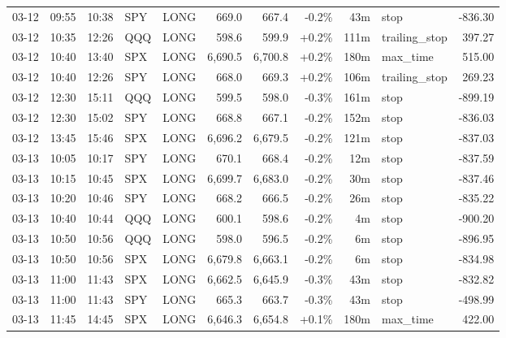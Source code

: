 \documentclass[11pt,a4paper,twoside]{article}
\begin{document}
\begin{center}
\begin{longtable}{>{\color{txtmain}}l l l l l r r r r >{\color{txtmain}}l r}
03-12 & 09:55 & 10:38 & SPY & LONG & 669.0 & 667.4 & \textcolor{lossred}{-0.2\%} & 43m & stop & \textcolor{lossred}{-836.30} \\
03-12 & 10:35 & 12:26 & QQQ & LONG & 598.6 & 599.9 & \textcolor{wingreen}{+0.2\%} & 111m & trailing\_stop & \textcolor{wingreen}{397.27} \\
03-12 & 10:40 & 13:40 & SPX & LONG & 6,690.5 & 6,700.8 & \textcolor{wingreen}{+0.2\%} & 180m & max\_time & \textcolor{wingreen}{515.00} \\
03-12 & 10:40 & 12:26 & SPY & LONG & 668.0 & 669.3 & \textcolor{wingreen}{+0.2\%} & 106m & trailing\_stop & \textcolor{wingreen}{269.23} \\
03-12 & 12:30 & 15:11 & QQQ & LONG & 599.5 & 598.0 & \textcolor{lossred}{-0.3\%} & 161m & stop & \textcolor{lossred}{-899.19} \\
03-12 & 12:30 & 15:02 & SPY & LONG & 668.8 & 667.1 & \textcolor{lossred}{-0.2\%} & 152m & stop & \textcolor{lossred}{-836.03} \\
03-12 & 13:45 & 15:46 & SPX & LONG & 6,696.2 & 6,679.5 & \textcolor{lossred}{-0.2\%} & 121m & stop & \textcolor{lossred}{-837.03} \\
03-13 & 10:05 & 10:17 & SPY & LONG & 670.1 & 668.4 & \textcolor{lossred}{-0.2\%} & 12m & stop & \textcolor{lossred}{-837.59} \\
03-13 & 10:15 & 10:45 & SPX & LONG & 6,699.7 & 6,683.0 & \textcolor{lossred}{-0.2\%} & 30m & stop & \textcolor{lossred}{-837.46} \\
03-13 & 10:20 & 10:46 & SPY & LONG & 668.2 & 666.5 & \textcolor{lossred}{-0.2\%} & 26m & stop & \textcolor{lossred}{-835.22} \\
03-13 & 10:40 & 10:44 & QQQ & LONG & 600.1 & 598.6 & \textcolor{lossred}{-0.2\%} & 4m & stop & \textcolor{lossred}{-900.20} \\
03-13 & 10:50 & 10:56 & QQQ & LONG & 598.0 & 596.5 & \textcolor{lossred}{-0.2\%} & 6m & stop & \textcolor{lossred}{-896.95} \\
03-13 & 10:50 & 10:56 & SPX & LONG & 6,679.8 & 6,663.1 & \textcolor{lossred}{-0.2\%} & 6m & stop & \textcolor{lossred}{-834.98} \\
03-13 & 11:00 & 11:43 & SPX & LONG & 6,662.5 & 6,645.9 & \textcolor{lossred}{-0.3\%} & 43m & stop & \textcolor{lossred}{-832.82} \\
03-13 & 11:00 & 11:43 & SPY & LONG & 665.3 & 663.7 & \textcolor{lossred}{-0.3\%} & 43m & stop & \textcolor{lossred}{-498.99} \\
03-13 & 11:45 & 14:45 & SPX & LONG & 6,646.3 & 6,654.8 & \textcolor{wingreen}{+0.1\%} & 180m & max\_time & \textcolor{wingreen}{422.00} \\

\end{longtable}
\end{center}
\end{document}
